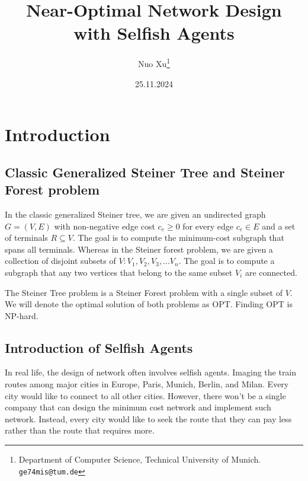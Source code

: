 \documentclass[11pt,psfig,times]{article}
\begin{document}
\title{Near-Optimal Network Design with Selfish Agents}
\author{Nuo Xu\thanks {Department of Computer Science, Technical University of Munich. {\tt ge74mis@tum.de}}}
\date{25.11.2024}
\maketitle

\section{Introduction}

\subsection{Classic Generalized Steiner Tree and Steiner Forest problem}
In the classic generalized Steiner tree, we are given an undirected graph \(G = (V,E)\) with non-negative edge cost \(c_e \geq 0\) for every edge $c_e \in E$ and a set of terminals $R \subseteq V $. The goal is to compute the minimum-cost subgraph that spans all terminals. Whereas in the Steiner forest problem, we are given a collection of disjoint subsets of \(V: V_1,V_2,V_3,...V_n\). The goal is to compute a subgraph that any two vertices that belong to the same subset \(V_i\) are connected. 

The Steiner Tree problem is a Steiner Forest problem with a single subset of \(V\). We will denote the optimal solution of both problems as OPT. Finding OPT is NP-hard. 

\subsection{Introduction of Selfish Agents}
In real life, the design of network often involves selfish agents. Imaging the train routes among major cities in Europe, Paris, Munich, Berlin, and Milan. Every city would like to connect to all other cities. However, there won't be a single company that can design the minimum cost network and implement such network. Instead, every city would like to seek the route that they can pay less rather than the route that requires more. 
\begin{figure}
	\begin{center}

\end{center}
\end{figure}
\end{document}
